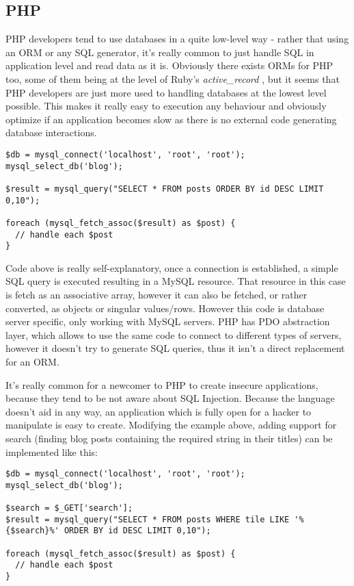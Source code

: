 \subsection{PHP}

PHP developers tend to use databases in a quite low-level way - rather that using an ORM or any SQL generator, it's really common to just handle SQL in application level and read data as it is. Obviously there exists ORMs for PHP too, some of them being at the level of Ruby's \textit{active\_record} , but it seems that PHP developers are just more used to handling databases at the lowest level possible. This makes it really easy to execution any behaviour and obviously optimize if an application becomes slow as there is no external code generating database interactions.

\begin{codelisting}
\begin{verbatim}
$db = mysql_connect('localhost', 'root', 'root');
mysql_select_db('blog');

$result = mysql_query("SELECT * FROM posts ORDER BY id DESC LIMIT 0,10");

foreach (mysql_fetch_assoc($result) as $post) {
  // handle each $post
}
\end{verbatim}
\end{codelisting}

Code above is really self-explanatory, once a connection is established, a simple SQL query is executed resulting in a MySQL resource. That resource in this case is fetch as an associative array, however it can also be fetched, or rather converted, as objects or singular values/rows. However this code is database server specific, only working with MySQL servers. PHP has PDO abstraction layer, which allows to use the same code to connect to different types of servers, however it doesn't try to generate SQL queries, thus it isn't a direct replacement for an ORM.

It's really common for a newcomer to PHP to create insecure applications, because they tend to be not aware about SQL Injection. Because the language doesn't aid in any way, an application which is fully open for a hacker to manipulate is easy to create. Modifying the example above, adding support for search (finding blog posts containing the required string in their titles) can be implemented like this:

\begin{codelisting}
\begin{verbatim}
$db = mysql_connect('localhost', 'root', 'root');
mysql_select_db('blog');

$search = $_GET['search'];
$result = mysql_query("SELECT * FROM posts WHERE tile LIKE '%{$search}%' ORDER BY id DESC LIMIT 0,10");

foreach (mysql_fetch_assoc($result) as $post) {
  // handle each $post
}
\end{verbatim}
\end{codelisting}

